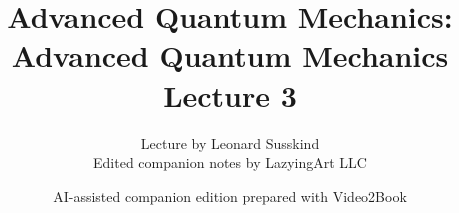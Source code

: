 \documentclass[11pt,oneside]{book}
\begin{document}
\frontmatter
\title{Advanced Quantum Mechanics: Advanced Quantum Mechanics Lecture 3}
\author{Lecture by Leonard Susskind\\Edited companion notes by LazyingArt LLC}
\date{AI-assisted companion edition prepared with Video2Book}
\maketitle
\clearpage
\mainmatter

\end{document}
